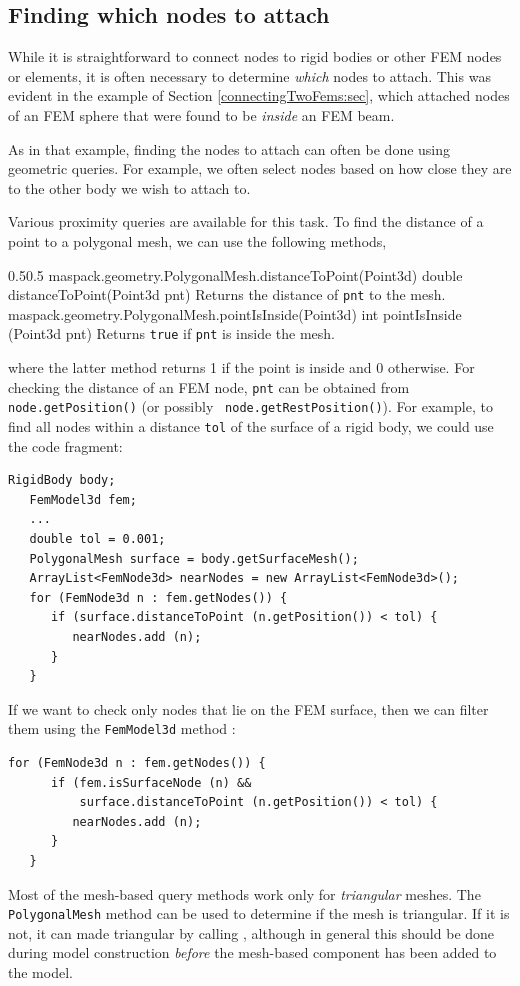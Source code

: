 \subsection{Finding which nodes to attach}

While it is straightforward to connect nodes to rigid bodies or other
FEM nodes or elements, it is often necessary to determine {\it which}
nodes to attach. This was evident in the example of
Section \ref{connectingTwoFems:sec}, which attached nodes of an FEM
sphere that were found to be {\it inside} an FEM beam.

As in that example, finding the nodes to attach can often be done
using geometric queries. For example, we often select nodes based on
how close they are to the other body we wish to attach to.

Various proximity queries are available for this task. To find the
distance of a point to a polygonal mesh, we can use the
following  methods,
%
%
\begin{methodtable}[4pt]{0.5}{0.5}
\midline
%
\methodentry
{maspack.geometry.PolygonalMesh.distanceToPoint(Point3d)}%
{double distanceToPoint(Point3d pnt)}%
{Returns the distance of {\tt pnt} to the mesh.}%
%
\methodentry
{maspack.geometry.PolygonalMesh.pointIsInside(Point3d)}%
{int pointIsInside (Point3d pnt)}%
{Returns {\tt true} if {\tt pnt} is inside the mesh.}%
%
\midline
\end{methodtable}
%
where the latter method returns 1 if the point is inside and 0
otherwise. For checking the distance of an FEM node, {\tt pnt} can be obtained
from {\tt node.getPosition()} (or possibly {\tt
node.getRestPosition()}). For example,
to find all nodes within a distance {\tt tol} of the surface
of a rigid body, we could use the code fragment:
%
\begin{lstlisting}[]
   RigidBody body;
   FemModel3d fem;
   ...
   double tol = 0.001;
   PolygonalMesh surface = body.getSurfaceMesh();
   ArrayList<FemNode3d> nearNodes = new ArrayList<FemNode3d>();
   for (FemNode3d n : fem.getNodes()) {
      if (surface.distanceToPoint (n.getPosition()) < tol) {
         nearNodes.add (n);
      }
   }
\end{lstlisting}
%
If we want to check only nodes that lie on the FEM surface, then we
can filter them using the {\tt FemModel3d}
method :
%
\begin{lstlisting}[]
   for (FemNode3d n : fem.getNodes()) {
      if (fem.isSurfaceNode (n) &&
          surface.distanceToPoint (n.getPosition()) < tol) {
         nearNodes.add (n);
      }
   }
\end{lstlisting}
%
\begin{sideblock}
Most of the mesh-based query methods work only for {\it triangular}
meshes. The {\tt PolygonalMesh} method
can be used to determine if the mesh is triangular. If it
is not, it can made triangular by calling
,
although in general this should be done during model construction {\it
before} the mesh-based component has been added to the model.
\end{sideblock}

